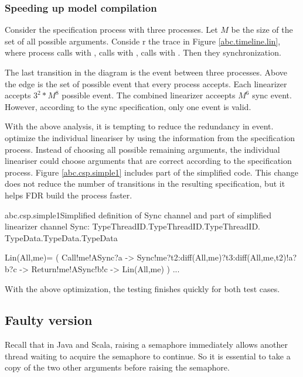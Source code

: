 \documentclass{article}
\begin{document}
\subsubsection{Speeding up model compilation}
Consider the specification process with three processes. Let $M$ be the size of the set of all possible arguments. Conside r the trace in Figure \ref{abc.timeline.lin}, where process  calls  with ,  calls  with ,  calls  with . Then they synchronization.


The last transition in the diagram is the  event between three processes. Above the edge is the set of possible  event that every process accepts. Each linearizer accepts $3^2*M^8$ possible  event. The combined linearizer acceepts $M^6$ sync event. However, according to the sync specification, only one  event is valid. 
    
With the above analysis, it is tempting to reduce the redundancy in  event. optimize the individual lineariser by using the information from the specification process. Instead of choosing all possible remaining arguments, the individual lineariser could choose arguments that are correct according to the specification process. Figure \ref{abc.csp.simple1} includes part of the simplified code. This change does not reduce the number of transitions in the resulting specification, but it helps FDR build the process faster.

\begin{cspinline}{abc.csp.simple1}{Simplified definition of Sync channel and part of simplified linearizer}
channel Sync: TypeThreadID.TypeThreadID.TypeThreadID.
              TypeData.TypeData.TypeData

Lin(All,me)= (
  Call!me!ASync?a ->
  Sync!me?t2:diff(All,{me})?t3:diff(All,{me,t2})!a?b?c ->
  Return!me!ASync!b!c ->
  Lin(All,me)
) ...
\end{cspinline}

With the above optimization, the testing finishes quickly for both test cases.

\subsection{Faulty version}
Recall that in Java and Scala, raising a semaphore immediately allows another thread waiting to acquire the semaphore to continue. So it is essential to take a copy of the two other arguments before raising the semaphore.
\end{document}
